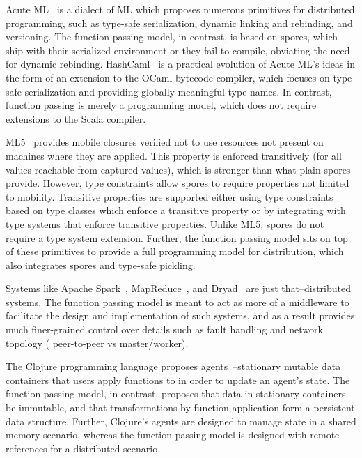 \documentclass{jfp1}
\begin{document}
Acute ML~\cite{AcuteML} is a dialect of ML which proposes numerous primitives
for distributed programming, such as type-safe serialization, dynamic linking
and rebinding, and versioning. The function passing model, in contrast, is based
on spores, which ship with their serialized environment or they fail to compile,
obviating the need for dynamic rebinding. HashCaml~\cite{DistOCaml} is a
practical evolution of Acute ML's ideas in the form of an extension to the OCaml
bytecode compiler, which focuses on type-safe serialization and providing
globally meaningful type names. In contrast, function passing is merely a
programming model, which does not require extensions to the Scala compiler.

ML5~\cite{Tom7} provides mobile closures verified not to use resources not
present on machines where they are applied. This property is enforced
transitively (for all values reachable from captured values), which is stronger
than what plain spores provide. However, type constraints allow spores to
require properties not limited to mobility. Transitive properties are supported
either using type constraints based on type classes which enforce a transitive
property or by integrating with type systems that enforce transitive properties.
Unlike ML5, spores do not require a type system extension. Further, the function
passing model sits on top of these primitives to provide a full programming
model for distribution, which also integrates spores and type-safe pickling.


Systems like Apache Spark~\cite{Spark}, MapReduce~\cite{MapReduce}, and
Dryad~\cite{Dryad} are just that--distributed systems. The function passing
model is meant to act as more of a middleware to facilitate the design and
implementation of such systems, and as a result provides much finer-grained
control over details such as fault handling and network topology (\ie
peer-to-peer vs master/worker).

The Clojure programming language proposes agents~\cite{Clojure}--stationary
mutable data containers that users apply functions to in order to update an
agent's state. The function passing model, in contrast, proposes that data in
stationary containers be immutable, and that transformations by function
application form a persistent data structure. Further, Clojure's agents are
designed to manage state in a shared memory scenario, whereas the function
passing model is designed with remote references for a distributed scenario.
\end{document}
